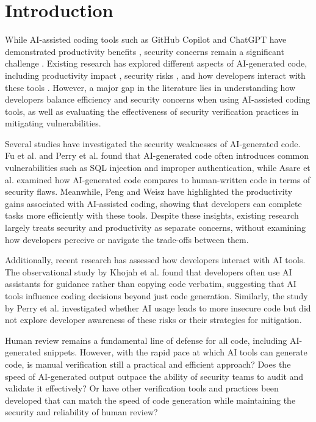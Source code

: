 \section{Introduction}

While AI-assisted coding tools such as GitHub Copilot and ChatGPT have demonstrated productivity benefits \cite{peng2023impact, weisz2025examining}, security concerns remain a significant challenge \cite{fu2025security, perry2023}. Existing research has explored different aspects of AI-generated code, including productivity impact \cite{peng2023impact, weisz2025examining}, security risks \cite{fu2025security, perry2023}, and how developers interact with these tools \cite{ranim2024}. However, a major gap in the literature lies in understanding how developers balance efficiency and security concerns when using AI-assisted coding tools, as well as evaluating the effectiveness of security verification practices in mitigating vulnerabilities.

Several studies have investigated the security weaknesses of AI-generated code. Fu et al. \cite{fu2025security} and Perry et al. \cite{perry2023} found that AI-generated code often introduces common vulnerabilities such as SQL injection and improper authentication, while Asare et al. \cite{asare2024} examined how AI-generated code compares to human-written code in terms of security flaws.  Meanwhile, Peng and Weisz \cite{peng2023impact, weisz2025examining} have highlighted the productivity gains associated with AI-assisted coding, showing that developers can complete tasks more efficiently with these tools. Despite these insights, existing research largely treats security and productivity as separate concerns, without examining how developers perceive or navigate the trade-offs between them.

Additionally, recent research has assessed how developers interact with AI tools. The observational study by Khojah et al. \cite{ranim2024} found that developers often use AI assistants for guidance rather than copying code verbatim, suggesting that AI tools influence coding decisions beyond just code generation. Similarly, the study by Perry et al. \cite{perry2023} investigated whether AI usage leads to more insecure code but did not explore developer awareness of these risks or their strategies for mitigation.

Human review remains a fundamental line of defense for all code, including AI-generated snippets. However, with the rapid pace at which AI tools can generate code, is manual verification still a practical and efficient approach? Does the speed of AI-generated output outpace the ability of security teams to audit and validate it effectively? Or have other verification tools and practices been developed that can match the speed of code generation while maintaining the security and reliability of human review?

